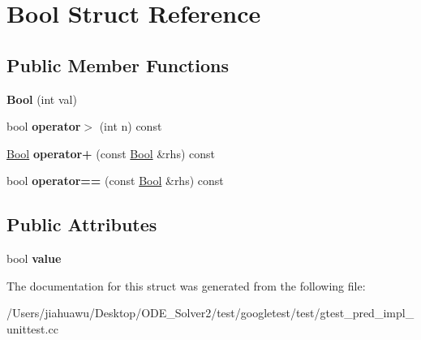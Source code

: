 \hypertarget{struct_bool}{}\section{Bool Struct Reference}
\label{struct_bool}
\subsection*{Public Member Functions}
\begin{DoxyCompactItemize}
\item 
\mbox{\label{struct_bool_a03dfd4851b13abb29414887fcada7fca}} 
{\bfseries Bool} (int val)
\item 
\mbox{\label{struct_bool_a7baecbc58992eb06157fbbbaa560be0b}} 
bool {\bfseries operator$>$} (int n) const
\item 
\mbox{\label{struct_bool_a6f4ecdec19082e896cffce66e6b6e7cc}} 
\mbox{\hyperlink{struct_bool}{Bool}} {\bfseries operator+} (const \mbox{\hyperlink{struct_bool}{Bool}} \&rhs) const
\item 
\mbox{\label{struct_bool_afe799a4977c5ebe4c215d5d4ebd77adb}} 
bool {\bfseries operator==} (const \mbox{\hyperlink{struct_bool}{Bool}} \&rhs) const
\end{DoxyCompactItemize}
\subsection*{Public Attributes}
\begin{DoxyCompactItemize}
\item 
\mbox{\label{struct_bool_a16be863c269f988cdcbe59f9d846a141}} 
bool {\bfseries value}
\end{DoxyCompactItemize}


The documentation for this struct was generated from the following file\+:\begin{DoxyCompactItemize}
\item 
/\+Users/jiahuawu/\+Desktop/\+O\+D\+E\+\_\+\+Solver2/test/googletest/test/gtest\+\_\+pred\+\_\+impl\+\_\+unittest.\+cc\end{DoxyCompactItemize}
